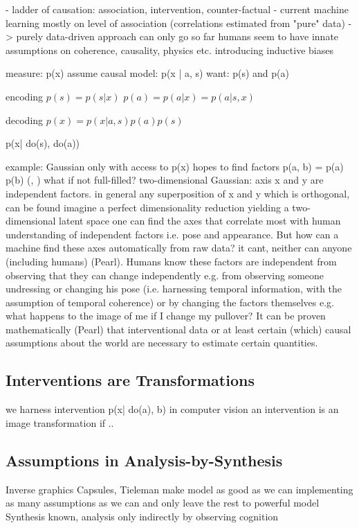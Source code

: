 	- ladder of causation: association, intervention, counter-factual
	- current machine learning mostly on level of association (correlations estimated from "pure" data)
	-> purely data-driven approach can only go so far
	humans seem to have innate assumptions on coherence, causality, physics etc. introducing inductive biases

	measure: p(x)
	assume causal model: p(x | a, s)
	want: p(s) and p(a)

	encoding
	$p(s) = p(s | x )$
	$p(a) = p(a | x) = p(a | s, x)$

	decoding
	$p(x) = p(x | a, s) p(a) p(s)$

	p(x| do(s), do(a))

	example: Gaussian
	only with access to p(x)
	hopes to find factors p(a, b) = p(a) p(b) (\cite{chen16infogan}, \cite{higgins16betavae})
	what if not full-filled?
	two-dimensional Gaussian: axis x and y are independent factors.
	in general any superposition of x and y which is orthogonal, can be found
	imagine a perfect dimensionality reduction yielding a  two-dimensional latent space one can find the axes that correlate most with human understanding of independent factors i.e. pose and appearance.
	But how can a machine find these axes automatically from raw data? it cant, neither can anyone (including humans) (Pearl). Humans know these factors are independent from observing that they can change independently e.g. from observing someone undressing or changing his pose (i.e. harnessing temporal information, with the assumption of temporal coherence) or by changing the factors themselves e.g. what happens to the image of me if I change my pullover?
	It can be proven mathematically (Pearl) that interventional data or at least certain (which) causal assumptions about the world are necessary to estimate certain quantities.

	\subsection{Interventions are Transformations}
	we harness intervention
	p(x| do(a), b)
	in computer vision an intervention is an image transformation if ..


	\subsection{Assumptions in Analysis-by-Synthesis}
		Inverse graphics
		Capsules, Tieleman \cite{tieleman14thesis}
	make model as good as we can implementing as many assumptions as we can and only leave the rest to powerful model
	Synthesis known, analysis only indirectly by observing cognition

